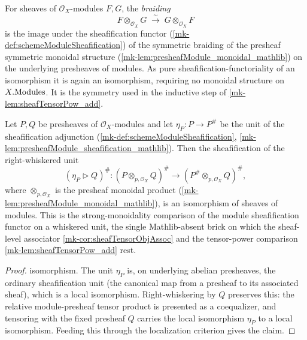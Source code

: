 \begin{definition}\label{mk-def:tensorBraiding}
  \leanok

  For sheaves of \(\mathcal{O}_X\)-modules \(F, G\), the \emph{braiding}
  \[
    F \otimes_{\mathcal{O}_X} G \;\xrightarrow{\ \sim\ }\;
      G \otimes_{\mathcal{O}_X} F
  \]
  is the image under the sheafification functor
  (\ref{mk-def:schemeModuleSheafification}) of the symmetric braiding of the
  presheaf symmetric monoidal structure (\ref{mk-lem:presheafModule_monoidal_mathlib})
  on the underlying presheaves of modules. As pure sheafification-functoriality of
  an isomorphism it is again an isomorphism, requiring no monoidal structure on
  \(X.\mathrm{Modules}\). It is the symmetry used in the inductive step of
  \ref{mk-lem:sheafTensorPow_add}.
\end{definition}

\begin{lemma}\label{mk-lem:isIso_sheafification_whiskerRight_unit}
  \leanok

  Let \(P, Q\) be presheaves of \(\mathcal{O}_X\)-modules and let
  \(\eta_P : P \to P^{\#}\) be the unit of the sheafification adjunction
  (\ref{mk-def:schemeModuleSheafification},
  \ref{mk-lem:presheafModule_sheafification_mathlib}). Then the sheafification of the
  right-whiskered unit
  \[
    (\eta_P \rhd Q)^{\#} :
      (P \otimes_{p,\mathcal{O}_X} Q)^{\#} \longrightarrow
      (P^{\#} \otimes_{p,\mathcal{O}_X} Q)^{\#},
  \]
  where \(\otimes_{p,\mathcal{O}_X}\) is the presheaf monoidal product
  (\ref{mk-lem:presheafModule_monoidal_mathlib}), is an isomorphism of sheaves of
  modules. This is the strong-monoidality comparison of the module sheafification
  functor on a whiskered unit, the single Mathlib-absent brick on which the
  sheaf-level associator \ref{mk-cor:sheafTensorObjAssoc} and the tensor-power
  comparison \ref{mk-lem:sheafTensorPow_add} rest.
\end{lemma}

\begin{proof}
  \leanok
  isomorphism. The unit \(\eta_P\) is, on underlying abelian presheaves, the
  ordinary sheafification unit (the canonical map from a presheaf to its associated sheaf), which is a local
  isomorphism. Right-whiskering by \(Q\) preserves this: the relative
  module-presheaf tensor product is presented as a coequalizer, and tensoring with
  the fixed presheaf \(Q\) carries the local isomorphism \(\eta_P\) to a local
  isomorphism. Feeding this through the localization criterion gives the claim.
\end{proof}

